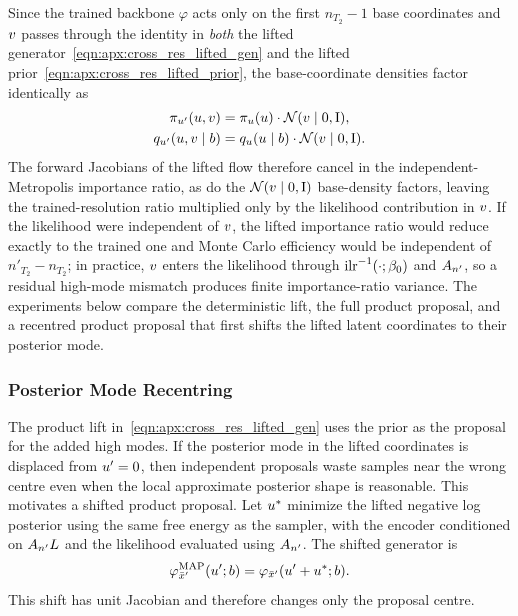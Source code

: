Since the trained backbone $\varphi$ acts only on the first $n_{T_2} - 1$ base coordinates and $v$ passes through the identity in \textit{both} the lifted generator~\eqref{eqn:apx:cross_res_lifted_gen} and the lifted prior~\eqref{eqn:apx:cross_res_lifted_prior}, the base-coordinate densities factor identically as
\begin{align}\label{eqn:apx:cross_res_density_factorization}
    \pi_{u'}(u, v)            & = \pi_{u}(u) \cdot \mathcal{N}(v \mid \mathrm{0}, \mathrm{I}),            \\
    q_{u'}(u, v \mid b) & = q_{u}(u \mid b) \cdot \mathcal{N}(v \mid \mathrm{0}, \mathrm{I}).
\end{align}
The forward Jacobians of the lifted flow therefore cancel in the independent-Metropolis importance ratio, as do the $\mathcal{N}(v \mid \mathrm{0}, \mathrm{I})$ base-density factors, leaving the trained-resolution ratio multiplied only by the likelihood contribution in $v$.
If the likelihood were independent of $v$, the lifted importance ratio would reduce exactly to the trained one and Monte Carlo efficiency would be independent of $n'_{T_2} - n_{T_2}$;
in practice, $v$ enters the likelihood through $\InvILR{\cdot; \beta_0}$ and $A_{n'}$, so a residual high-mode mismatch produces finite importance-ratio variance.
The experiments below compare the deterministic lift, the full product proposal, and a recentred product proposal that first shifts the lifted latent coordinates to their posterior mode.

\subsubsection{Posterior Mode Recentring}

The product lift in~\eqref{eqn:apx:cross_res_lifted_gen} uses the prior as the proposal for the added high modes.
If the posterior mode in the lifted coordinates is displaced from $u' = \mathrm{0}$, then independent proposals waste samples near the wrong centre even when the local approximate posterior shape is reasonable.
This motivates a shifted product proposal.
Let $u^*$ minimize the lifted negative log posterior using the same free energy as the sampler, with the encoder conditioned on $A_{n'} L$ and the likelihood evaluated using $A_{n'}$.
The shifted generator is
\begin{align}\label{eqn:apx:cross_res_map_shift}
    \varphi^{\mathrm{MAP}}_{\bar{x}'}(u'; b) = \varphi_{\bar{x}'}(u' + u^*; b).
\end{align}
This shift has unit Jacobian and therefore changes only the proposal centre.

